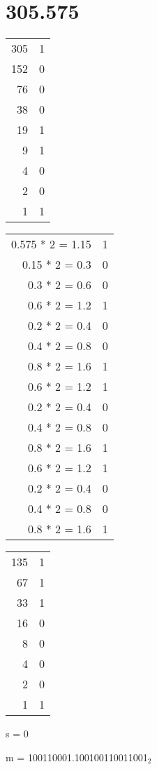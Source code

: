 \documentclass{article}
\begin{document}
\section{305.575}\begin{multicols}{3}\begin{center}
\begin{tabular}{r | l}
305&1\\
152&0\\
76&0\\
38&0\\
19&1\\
9&1\\
4&0\\
2&0\\
1&1\\
\end{tabular}

\begin{tabular}{r | l}
0.575 * 2 = 1.15&1\\
0.15 * 2 = 0.3&0\\
0.3 * 2 = 0.6&0\\
0.6 * 2 = 1.2&1\\
0.2 * 2 = 0.4&0\\
0.4 * 2 = 0.8&0\\
0.8 * 2 = 1.6&1\\
0.6 * 2 = 1.2&1\\
0.2 * 2 = 0.4&0\\
0.4 * 2 = 0.8&0\\
0.8 * 2 = 1.6&1\\
0.6 * 2 = 1.2&1\\
0.2 * 2 = 0.4&0\\
0.4 * 2 = 0.8&0\\
0.8 * 2 = 1.6&1\\
\end{tabular}

\begin{tabular}{r | l}
135&1\\
67&1\\
33&1\\
16&0\\
8&0\\
4&0\\
2&0\\
1&1\\
\end{tabular}
\end{center}\end{multicols}
s = 0

m = 100110001.100100110011001$_2$
\end{document}
